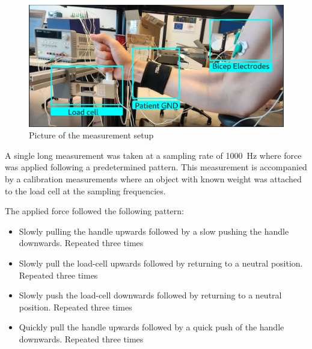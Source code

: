 \begin{figure}[h!t]
	\begin{center}
		\includegraphics[width=1.0\columnwidth]{images/setup_photo.png}
	\end{center}
	\caption{Picture of the measurement setup}
	\label{fig:measurement_setup_photo}
\end{figure}

A single long measurement was taken at a sampling rate of \SI{1000}{\hertz} where force was applied following a predetermined pattern. This measurement is accompanied by a calibration measurements where an object with known weight was attached to the load cell at the sampling frequencies.

The applied force followed the following pattern:
\begin{itemize}
    \item Slowly pulling the handle upwards followed by a slow pushing the handle downwards. Repeated three times
    \item Slowly pull the load-cell upwards followed by returning to a neutral position. Repeated three times
    \item Slowly push the load-cell downwards followed by returning to a neutral position. Repeated three times
    \item Quickly pull the handle upwards followed by a quick push of the handle downwards. Repeated three times
\end{itemize}

